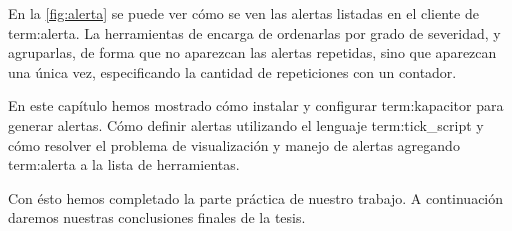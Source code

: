 En la \autoref{fig:alerta} se puede ver cómo se ven las alertas listadas en el
cliente de \gls{term:alerta}. La herramientas de encarga de ordenarlas por grado
de severidad, y agruparlas, de forma que no aparezcan las alertas repetidas,
sino que aparezcan una única vez, especificando la cantidad de repeticiones con
un contador.

En este capítulo hemos mostrado cómo instalar y configurar \gls{term:kapacitor}
para generar alertas. Cómo definir alertas utilizando el lenguaje
\gls{term:tick_script} y cómo resolver el problema de visualización y manejo de
alertas agregando \gls{term:alerta} a la lista de herramientas.

Con ésto hemos completado la parte práctica de nuestro trabajo. A continuación daremos nuestras conclusiones finales de la tesis.
